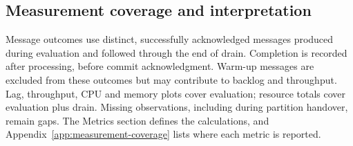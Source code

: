 \subsection{Measurement coverage and interpretation}\label{sec:result-metric-coverage}\label{app:four-condition-diagnostics}
Message outcomes use distinct, successfully acknowledged messages produced during evaluation and followed through the end of drain. Completion is recorded after processing, before commit acknowledgment. Warm-up messages are excluded from these outcomes but may contribute to backlog and throughput. Lag, throughput, CPU and memory plots cover evaluation; resource totals cover evaluation plus drain. Missing observations, including during partition handover, remain gaps. The Metrics section defines the calculations, and Appendix~\ref{app:measurement-coverage} lists where each metric is reported.
